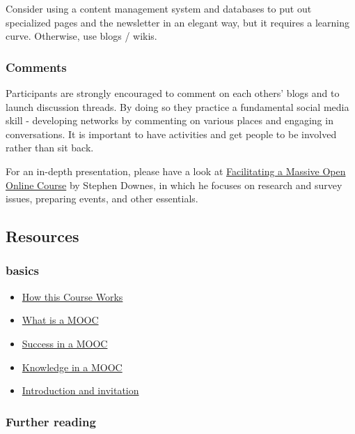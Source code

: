 Consider using a content management system and databases to put out
specialized pages and the newsletter in an elegant way, but it requires
a learning curve. Otherwise, use blogs / wikis.

\subsubsection{Comments}

Participants are strongly encouraged to comment on each others' blogs
and to launch discussion threads. By doing so they practice a
fundamental social media skill - developing networks by commenting on
various places and engaging in conversations. It is important to have
activities and get people to be involved rather than sit back.

For an in-depth presentation, please have a look at
\href{http://www.downes.ca/presentation/290}{Facilitating a Massive Open
Online Course} by Stephen Downes, in which he focuses on research and
survey issues, preparing events, and other essentials.

\subsection{Resources}

\subsubsection{basics}

\begin{itemize}
\item
  \href{http://change.mooc.ca/how.htm}{How this Course Works}
\item
  \href{http://www.youtube.com/watch?v=eW3gMGqcZQc}{What is a MOOC}
\item
  \href{http://www.youtube.com/watch?v=r8avYQ5ZqM0}{Success in a MOOC}
\item
  \href{http://www.youtube.com/watch?v=bWKdhzSAAG0}{Knowledge in a MOOC}
\item
  \href{http://www.youtube.com/watch?v=mqnyhLfNH3I}{Introduction and
  invitation}
\end{itemize}
\subsubsection{Further reading}

